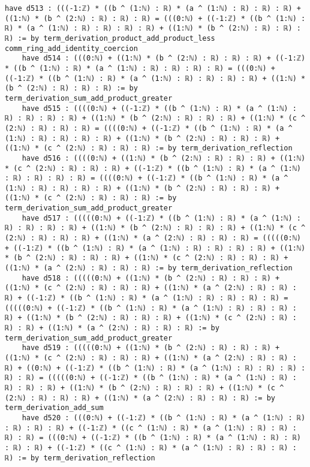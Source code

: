 \documentclass{article}
\begin{document}
\begin{tcolorbox}[colback=white!10, width=\linewidth]
\begin{lstlisting}[language=Lean4]
    have d513 : (((-1:ℤ) * ((b ^ (1:ℕ) : ℝ) * (a ^ (1:ℕ) : ℝ) : ℝ) : ℝ) + ((1:ℕ) * (b ^ (2:ℕ) : ℝ) : ℝ) : ℝ) = (((0:ℕ) + ((-1:ℤ) * ((b ^ (1:ℕ) : ℝ) * (a ^ (1:ℕ) : ℝ) : ℝ) : ℝ) : ℝ) + ((1:ℕ) * (b ^ (2:ℕ) : ℝ) : ℝ) : ℝ) := by term_derivation_product_add_product_less comm_ring_add_identity_coercion
    have d514 : (((0:ℕ) + ((1:ℕ) * (b ^ (2:ℕ) : ℝ) : ℝ) : ℝ) + ((-1:ℤ) * ((b ^ (1:ℕ) : ℝ) * (a ^ (1:ℕ) : ℝ) : ℝ) : ℝ) : ℝ) = (((0:ℕ) + ((-1:ℤ) * ((b ^ (1:ℕ) : ℝ) * (a ^ (1:ℕ) : ℝ) : ℝ) : ℝ) : ℝ) + ((1:ℕ) * (b ^ (2:ℕ) : ℝ) : ℝ) : ℝ) := by term_derivation_sum_add_product_greater
    have d515 : ((((0:ℕ) + ((-1:ℤ) * ((b ^ (1:ℕ) : ℝ) * (a ^ (1:ℕ) : ℝ) : ℝ) : ℝ) : ℝ) + ((1:ℕ) * (b ^ (2:ℕ) : ℝ) : ℝ) : ℝ) + ((1:ℕ) * (c ^ (2:ℕ) : ℝ) : ℝ) : ℝ) = ((((0:ℕ) + ((-1:ℤ) * ((b ^ (1:ℕ) : ℝ) * (a ^ (1:ℕ) : ℝ) : ℝ) : ℝ) : ℝ) + ((1:ℕ) * (b ^ (2:ℕ) : ℝ) : ℝ) : ℝ) + ((1:ℕ) * (c ^ (2:ℕ) : ℝ) : ℝ) : ℝ) := by term_derivation_reflection
    have d516 : ((((0:ℕ) + ((1:ℕ) * (b ^ (2:ℕ) : ℝ) : ℝ) : ℝ) + ((1:ℕ) * (c ^ (2:ℕ) : ℝ) : ℝ) : ℝ) + ((-1:ℤ) * ((b ^ (1:ℕ) : ℝ) * (a ^ (1:ℕ) : ℝ) : ℝ) : ℝ) : ℝ) = ((((0:ℕ) + ((-1:ℤ) * ((b ^ (1:ℕ) : ℝ) * (a ^ (1:ℕ) : ℝ) : ℝ) : ℝ) : ℝ) + ((1:ℕ) * (b ^ (2:ℕ) : ℝ) : ℝ) : ℝ) + ((1:ℕ) * (c ^ (2:ℕ) : ℝ) : ℝ) : ℝ) := by term_derivation_sum_add_product_greater
    have d517 : (((((0:ℕ) + ((-1:ℤ) * ((b ^ (1:ℕ) : ℝ) * (a ^ (1:ℕ) : ℝ) : ℝ) : ℝ) : ℝ) + ((1:ℕ) * (b ^ (2:ℕ) : ℝ) : ℝ) : ℝ) + ((1:ℕ) * (c ^ (2:ℕ) : ℝ) : ℝ) : ℝ) + ((1:ℕ) * (a ^ (2:ℕ) : ℝ) : ℝ) : ℝ) = (((((0:ℕ) + ((-1:ℤ) * ((b ^ (1:ℕ) : ℝ) * (a ^ (1:ℕ) : ℝ) : ℝ) : ℝ) : ℝ) + ((1:ℕ) * (b ^ (2:ℕ) : ℝ) : ℝ) : ℝ) + ((1:ℕ) * (c ^ (2:ℕ) : ℝ) : ℝ) : ℝ) + ((1:ℕ) * (a ^ (2:ℕ) : ℝ) : ℝ) : ℝ) := by term_derivation_reflection
    have d518 : (((((0:ℕ) + ((1:ℕ) * (b ^ (2:ℕ) : ℝ) : ℝ) : ℝ) + ((1:ℕ) * (c ^ (2:ℕ) : ℝ) : ℝ) : ℝ) + ((1:ℕ) * (a ^ (2:ℕ) : ℝ) : ℝ) : ℝ) + ((-1:ℤ) * ((b ^ (1:ℕ) : ℝ) * (a ^ (1:ℕ) : ℝ) : ℝ) : ℝ) : ℝ) = (((((0:ℕ) + ((-1:ℤ) * ((b ^ (1:ℕ) : ℝ) * (a ^ (1:ℕ) : ℝ) : ℝ) : ℝ) : ℝ) + ((1:ℕ) * (b ^ (2:ℕ) : ℝ) : ℝ) : ℝ) + ((1:ℕ) * (c ^ (2:ℕ) : ℝ) : ℝ) : ℝ) + ((1:ℕ) * (a ^ (2:ℕ) : ℝ) : ℝ) : ℝ) := by term_derivation_sum_add_product_greater
    have d519 : (((((0:ℕ) + ((1:ℕ) * (b ^ (2:ℕ) : ℝ) : ℝ) : ℝ) + ((1:ℕ) * (c ^ (2:ℕ) : ℝ) : ℝ) : ℝ) + ((1:ℕ) * (a ^ (2:ℕ) : ℝ) : ℝ) : ℝ) + ((0:ℕ) + ((-1:ℤ) * ((b ^ (1:ℕ) : ℝ) * (a ^ (1:ℕ) : ℝ) : ℝ) : ℝ) : ℝ) : ℝ) = (((((0:ℕ) + ((-1:ℤ) * ((b ^ (1:ℕ) : ℝ) * (a ^ (1:ℕ) : ℝ) : ℝ) : ℝ) : ℝ) + ((1:ℕ) * (b ^ (2:ℕ) : ℝ) : ℝ) : ℝ) + ((1:ℕ) * (c ^ (2:ℕ) : ℝ) : ℝ) : ℝ) + ((1:ℕ) * (a ^ (2:ℕ) : ℝ) : ℝ) : ℝ) := by term_derivation_add_sum
    have d520 : (((0:ℕ) + ((-1:ℤ) * ((b ^ (1:ℕ) : ℝ) * (a ^ (1:ℕ) : ℝ) : ℝ) : ℝ) : ℝ) + ((-1:ℤ) * ((c ^ (1:ℕ) : ℝ) * (a ^ (1:ℕ) : ℝ) : ℝ) : ℝ) : ℝ) = (((0:ℕ) + ((-1:ℤ) * ((b ^ (1:ℕ) : ℝ) * (a ^ (1:ℕ) : ℝ) : ℝ) : ℝ) : ℝ) + ((-1:ℤ) * ((c ^ (1:ℕ) : ℝ) * (a ^ (1:ℕ) : ℝ) : ℝ) : ℝ) : ℝ) := by term_derivation_reflection

\end{lstlisting}
\end{tcolorbox}
\end{document}
